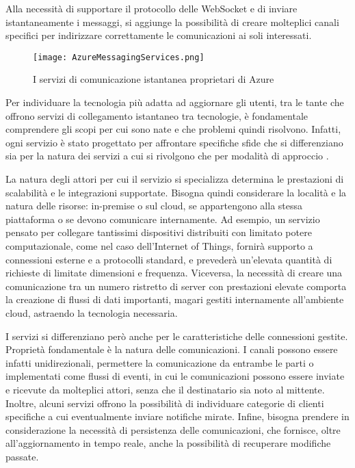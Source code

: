 Alla necessità di supportare il protocollo delle WebSocket e di inviare istantaneamente i messaggi, si aggiunge la possibilità di creare molteplici canali specifici per indirizzare correttamente le comunicazioni ai soli interessati.


\begin{figure}[h!]
    \centering
    \texttt{[image: AzureMessagingServices.png]}
    \caption{I servizi di comunicazione istantanea proprietari di Azure}
\end{figure}	


Per individuare la tecnologia più adatta ad aggiornare gli utenti, tra le tante che offrono servizi di collegamento istantaneo tra tecnologie, è fondamentale comprendere  gli scopi per cui sono nate e che problemi quindi risolvono. Infatti, ogni servizio è stato progettato per affrontare specifiche sfide che si differenziano sia per la natura dei servizi a cui si rivolgono che per  modalità di approccio .

La natura degli attori per cui il servizio si specializza determina le prestazioni di scalabilità e le integrazioni supportate. Bisogna quindi considerare la località e la natura delle risorse: in-premise o sul cloud, se appartengono alla stessa piattaforma o se devono comunicare internamente.
Ad esempio, un servizio pensato per collegare tantissimi dispositivi distribuiti con limitato potere computazionale, come nel caso dell’Internet of Things, fornirà  supporto a connessioni esterne e a protocolli standard, e prevederà un’elevata quantità di richieste di limitate dimensioni e frequenza. Viceversa, la necessità di creare una comunicazione tra un numero ristretto di server con prestazioni elevate comporta la creazione di flussi di dati importanti, magari gestiti internamente all’ambiente cloud, astraendo la tecnologia necessaria.

I servizi si differenziano però anche per le caratteristiche delle connessioni gestite.
Proprietà fondamentale è la natura delle comunicazioni. I canali possono essere infatti unidirezionali, permettere la comunicazione da entrambe le parti o implementati come flussi di eventi, in cui le comunicazioni possono essere inviate e ricevute da molteplici attori, senza che il destinatario sia noto al mittente. Inoltre, alcuni servizi offrono la possibilità di individuare categorie di clienti specifiche a cui eventualmente inviare notifiche mirate. Infine, bisogna prendere in considerazione la necessità di persistenza delle comunicazioni, che fornisce, oltre all’aggiornamento in tempo reale, anche la possibilità di recuperare modifiche passate.

